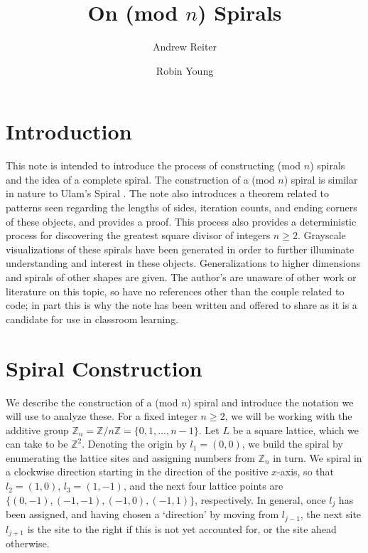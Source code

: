 \documentclass[11pt,reqno]{amsart}
\title{On (mod $n$) Spirals}
\author{Andrew Reiter}
\author{Robin Young}
\theoremstyle{mydef}
\def\ZZ{\mathbb{Z}}
\begin{document}
\maketitle
\section{Introduction}

This note is intended to introduce the process of constructing (mod $n$) spirals and the idea of a complete spiral.  The construction of a (mod $n$) spiral is similar in nature to Ulam's Spiral \cite{Ulam}. The note also introduces a theorem related to patterns seen regarding the lengths of sides, iteration counts, and ending corners of these objects, and provides a proof. This process also provides a deterministic process for discovering the greatest square divisor of integers $n \ge 2$. Grayscale visualizations of these spirals have been generated in order to  further illuminate understanding and interest in these objects. Generalizations to higher dimensions and spirals of other shapes are given. The author's are unaware of other work or literature on this topic, so have no references other than the couple related to code; in part this is why the note has been written and offered to share as it is a candidate for use in classroom learning.



\section{Spiral Construction}

We describe the construction of a (mod $n$) spiral and introduce the
notation we will use to analyze these.  For a fixed integer $n \ge 2$,
we will be working with the additive group
$\ZZ_n=\mathbb{Z}/n\mathbb{Z} = \{ 0, 1, ..., n-1 \}$.  Let $L$
be a square lattice, which we can take to be $\ZZ^2$.  Denoting
the origin by $l_1 = (0,0)$, we build the spiral by enumerating the
lattice sites and assigning numbers from $\mathbb{Z}_n$ in turn.  We
spiral in a clockwise direction starting in the direction of the
positive $x$-axis, so that $l_2 = (1,0)$, $l_3 = (1,-1)$, and the next four
lattice points are $\{(0, -1),(-1, -1),(-1, 0),(-1, 1)\}$,
respectively.  In general, once $l_j$ has been assigned, and having
chosen a `direction' by moving from $l_{j-1}$, the next site $l_{j+1}$
is the site to the right if this is not yet accounted for, or the site
ahead otherwise.
\end{document}

